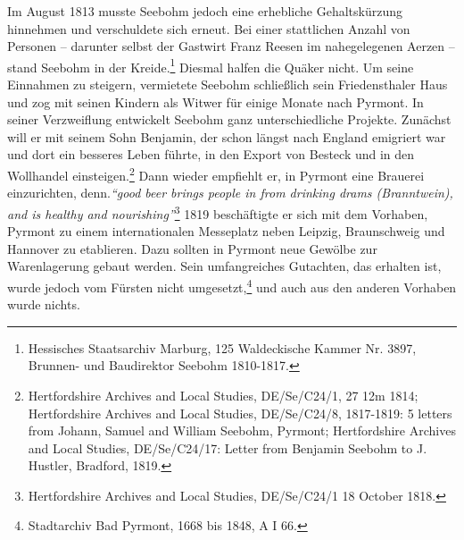 \medskip

Im August 1813 musste Seebohm jedoch eine erhebliche Gehaltskürzung hinnehmen
und verschuldete sich erneut. Bei einer stattlichen Anzahl von Personen --
darunter selbst der Gastwirt Franz Reesen im nahegelegenen Aerzen -- stand Seebohm in der
Kreide.\footnote{Hessisches Staatsarchiv Marburg, 125 Waldeckische Kammer Nr.
3897, Brunnen-
und Baudirektor Seebohm 1810-1817.} Diesmal halfen die Quäker nicht. Um seine
Einnahmen zu steigern, vermietete Seebohm schließlich sein Friedensthaler Haus
und zog mit seinen Kindern als Witwer für einige Monate nach Pyrmont. In seiner
Verzweiflung entwickelt Seebohm ganz unterschiedliche Projekte. Zunächst will er
mit seinem Sohn Benjamin, der schon längst
nach England emigriert war und dort ein
besseres Leben führte, in den Export von Besteck und in den
Wollhandel einsteigen.\footnote{Hertfordshire Archives and Local Studies,
DE/Se/C24/1, 27 12m 1814;
Hertfordshire Archives and Local Studies, DE/Se/C24/8, 1817-1819: 5 letters from
Johann, Samuel and William Seebohm, Pyrmont; Hertfordshire Archives and Local
Studies, DE/Se/C24/17: Letter from Benjamin Seebohm to J. Hustler, Bradford,
1819.}
Dann wieder empfiehlt er, in Pyrmont eine
Brauerei einzurichten, denn.\textit{"`good beer
brings people in from drinking drams (Branntwein), and is healthy and
nourishing"'}\footnote{Hertfordshire Archives and Local Studies, DE/Se/C24/1 18
October 1818.} 1819 beschäftigte er sich mit dem Vorhaben, Pyrmont zu einem
internationalen Messeplatz neben Leipzig, Braunschweig und Hannover zu
etablieren. Dazu sollten in Pyrmont neue Gewölbe zur Warenlagerung gebaut
werden. Sein umfangreiches Gutachten, das erhalten ist, wurde jedoch vom Fürsten
nicht umgesetzt,\footnote{Stadtarchiv Bad Pyrmont, 1668 bis 1848, A I 66.} und
auch aus den anderen Vorhaben wurde nichts.

\medskip

